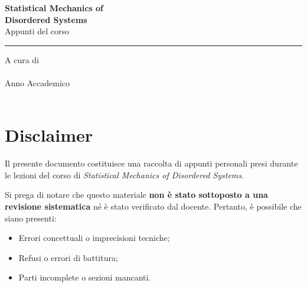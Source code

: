 \documentclass[12pt, a4paper]{book}
\begin{document}
\begin{titlepage}
\begin{flushleft}
        \vspace{4.5cm}
        
        \textcolor{colorE}{\sffamily\fontsize{60}{70}\selectfont\textbf{Statistical Mechanics of}}\\[0.1cm]
        \textcolor{colorE}{\sffamily\fontsize{60}{70}\selectfont\textbf{Disordered Systems}}\\[0.6cm]
        \textcolor{white!80}{\sffamily\Large Appunti del corso}\\[0.5cm]
        \textcolor{white!30}{\rule{6cm}{1pt}} %
    \end{flushleft}
    
    \vfill %
    
    \begin{flushleft}
        \textcolor{white!60}{\sffamily\large A cura di}\\[0.2cm]
        \textcolor{white}{\sffamily\huge\textbf{Elisabetta Agnello}}\\[1.2cm]
        
        \textcolor{white!60}{\sffamily\large Anno Accademico}\\[0.2cm]
        \textcolor{white}{\sffamily\Large\textbf{2025/2026}}
    \end{flushleft}
    
    \vspace*{1cm} %
\end{titlepage}
    

\frontmatter %
\chapter*{Disclaimer}
\thispagestyle{empty} %

Il presente documento costituisce una raccolta di appunti personali presi durante le lezioni del corso di \textit{Statistical Mechanics of Disordered Systems}. 

Si prega di notare che questo materiale \textbf{non è stato sottoposto a una revisione sistematica} né è stato verificato dal docente. Pertanto, è possibile che siano presenti:
\begin{itemize}
    \item Errori concettuali o imprecisioni tecniche;
    \item Refusi o errori di battitura;
    \item Parti incomplete o sezioni mancanti.
\end{itemize}
\end{document}
